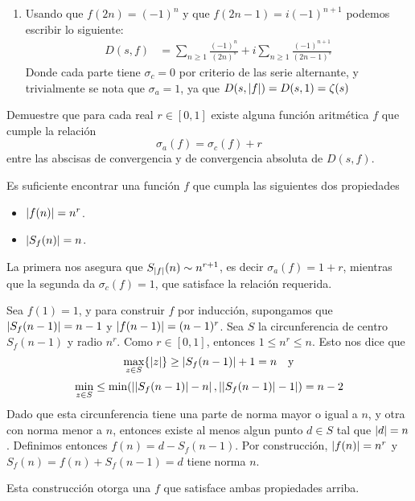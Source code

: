 \begin{sol}
\begin{enumerate}[label = (\roman*)]
        \item Usando que $f(2n)=(-1)^n$ y que $f(2n-1)=i(-1)^{n+1}$ podemos escribir lo siguiente:
        \begin{align*}
            D(s,f)&=\sum_{n\geq1}\frac{(-1)^n}{(2n)^s}+i\sum_{n\geq1}\frac{(-1)^{n+1}}{(2n-1)^s}
        \end{align*}
        Donde cada parte tiene $\sigma_c=0$ por criterio de las serie alternante, y trivialmente se nota que $\sigma_a=1$, ya que $D(s,\left|f\right|)=D(s,1)=\zeta(s)$
    \end{enumerate}
\end{sol}

\begin{prob}[3 pts.]
    Demuestre que para cada real $r\in[0,1]$ existe alguna función aritmética $f$ que cumple la relación
    \[\sigma_a(f)=\sigma_c(f)+r\]
    entre las abscisas de convergencia y de convergencia absoluta de $D(s,f)$.
\end{prob}

\begin{sol}
    Es suficiente encontrar una función $f$ que cumpla las siguientes dos propiedades
    \begin{itemize}
        \item $\left|f(n)\right| = n^r$.
        \item $\left|S_f(n)\right| = n$.
    \end{itemize}
    La primera nos asegura que $S_{\left|f\right|}(n) \sim n^{r+1}$, es decir $\sigma_a(f) = 1+r$, mientras que la segunda da $\sigma_c(f) = 1$, que satisface la relación requerida.

    Sea $f(1) = 1$, y para construir $f$ por inducción, supongamos que $\left|S_f(n-1)\right| = n-1$ y $\left|f(n-1)\right| = (n-1)^r$. Sea $S$ la circunferencia de centro $S_f(n-1)$ y radio $n^r$. Como $r \in [0,1]$, entonces $1 \leq n^r \leq n$. Esto nos dice que
    $$\max_{z \in S}\{\left|z\right|\} \geq \left|S_f(n-1)\right| + 1 = n\quad \text{y}$$
    $$\min_{z \in S} \leq \min(\left|\left|S_f(n-1)\right| - n\right|,\left|\left|S_f(n-1)\right| - 1\right|) = n-2$$
    Dado que esta circunferencia tiene una parte de norma mayor o igual a $n$, y otra con norma menor a $n$, entonces existe al menos algun punto $d \in S$ tal que $\left|d\right| = n$. Definimos entonces $f(n) = d - S_f(n-1)$. Por construcción, $\left|f(n)\right| = n^r$ y $S_f(n) = f(n) + S_f(n-1) = d$ tiene norma $n$.

    Esta construcción otorga una $f$ que satisface ambas propiedades arriba.
\end{sol}

